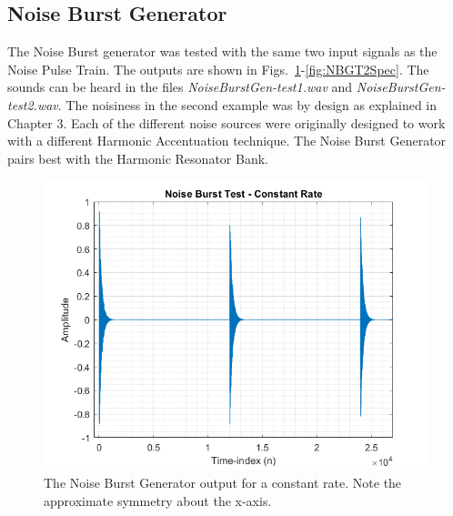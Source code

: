 \documentclass[../main.tex]{subfiles}
\begin{document}
\clearpage

\subsection{Noise Burst Generator}
\label{sec:NBGVerify}
The Noise Burst generator was tested with the same two input signals as the Noise Pulse Train. The outputs are shown in Figs.~\ref{fig:NBGT1}-\ref{fig:NBGT2Spec}. The sounds can be heard in the files \emph{NoiseBurstGen-test1.wav} and \emph{NoiseBurstGen-test2.wav}. The noisiness in the second example was by design as explained in Chapter 3. Each of the different noise sources were originally designed to work with a different Harmonic Accentuation technique. The Noise Burst Generator pairs best with the Harmonic Resonator Bank.

\begin{figure}[hb]
    \centering
    \includegraphics[scale=.65]{./images/plots/NBGTest1.png}
    \caption{The Noise Burst Generator output for a constant rate. Note the approximate symmetry about the x-axis.}
    \label{fig:NBGT1}
\end{figure}
\end{document}

